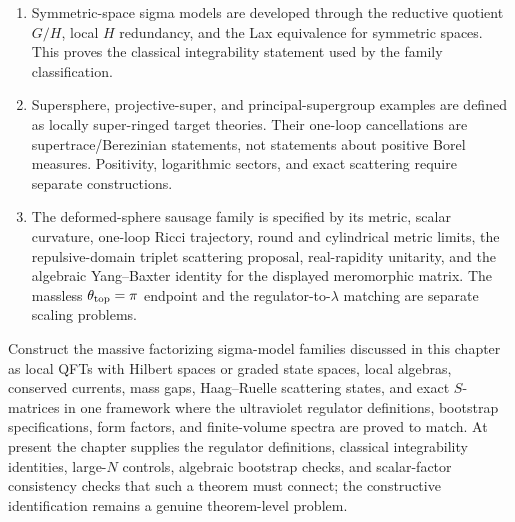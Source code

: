 \begin{definition}
\begin{enumerate}
  a separate construction problem.
  \item Symmetric-space sigma models are developed through the reductive
  quotient \(G/H\), local \(H\) redundancy, and the Lax equivalence for
  symmetric spaces.  This proves the classical integrability statement used
  by the family classification.
  \item Supersphere, projective-super, and principal-supergroup examples are
  defined as locally super-ringed target theories.  Their one-loop
  cancellations are supertrace/Berezinian statements, not statements about
  positive Borel measures.  Positivity, logarithmic sectors, and exact
  scattering require separate constructions.
  \item The deformed-sphere sausage family is specified by its metric, scalar
  curvature, one-loop Ricci trajectory, round and cylindrical metric limits,
  the repulsive-domain triplet scattering proposal, real-rapidity unitarity,
  and the algebraic Yang--Baxter identity for the displayed meromorphic
  matrix.  The massless \(\theta_{\rm top}=\pi\) endpoint and the
  regulator-to-\(\lambda\) matching are separate scaling problems.
\end{enumerate}
\end{definition}

\begin{openproblem}
\label{op:constructive-factorizing-on-gn}
Construct the massive factorizing sigma-model families discussed in this
chapter as local QFTs with Hilbert spaces or graded state spaces, local
algebras, conserved currents, mass gaps, Haag--Ruelle scattering states, and
exact \(S\)-matrices in one framework where the ultraviolet regulator
definitions, bootstrap specifications, form factors, and finite-volume spectra
are proved to match.
At present the chapter supplies the regulator definitions, classical
integrability identities, large-\(N\) controls, algebraic bootstrap checks,
and scalar-factor consistency checks that such a theorem must connect; the constructive
identification remains a genuine theorem-level problem.
\end{openproblem}
